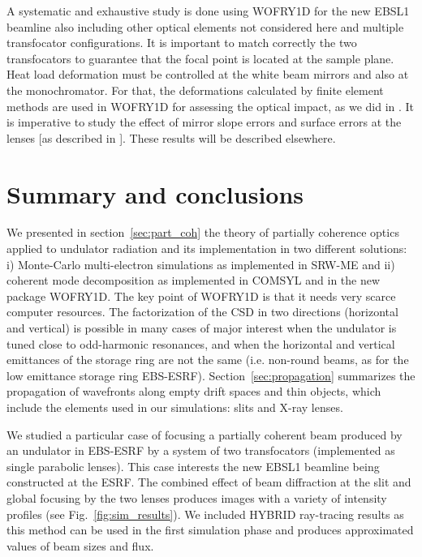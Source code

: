 \documentclass{iucr}
\newcommand{\inblue}[1]{{\color{blue}#1}}
\begin{document}
A systematic and exhaustive study is done using WOFRY1D for the new EBSL1 beamline also including other optical elements not considered here and multiple transfocator configurations. It is important to match correctly the two transfocators to guarantee that the focal point is located at the sample plane. Heat load deformation must be controlled at the white beam mirrors and also at the monochromator. For that, the deformations calculated by finite element methods are used in WOFRY1D for assessing the optical impact, as we did in \cite{srioLBL}. It is imperative to study the effect of mirror slope errors and surface errors at the lenses [as described in \cite{Celestre:mo5214}]. These results will be described elsewhere.


\section{Summary and conclusions}
\label{sec:summary}

We presented in section~\ref{sec:part_coh} the theory of partially coherence optics applied to undulator radiation and its implementation in two different solutions: i) Monte-Carlo multi-electron simulations as implemented in SRW-ME and ii) coherent mode decomposition as implemented in COMSYL and in the new package WOFRY1D.
The key point of WOFRY1D is that it needs very scarce computer resources.
The factorization of the CSD in two directions (horizontal and vertical) is possible in many cases of major interest when the undulator is tuned close to odd-harmonic resonances, and when the horizontal and vertical emittances of the storage ring are not the same (i.e. non-round beams, as for the low emittance storage ring  EBS-ESRF). 
Section~\ref{sec:propagation} summarizes the propagation of wavefronts along empty drift spaces and thin objects, which include the elements used in our simulations: slits and X-ray lenses. 

We studied a particular case of focusing a partially coherent beam produced by an undulator in EBS-ESRF by a system of two transfocators (implemented as single parabolic lenses). This case interests the new EBSL1 beamline being constructed at the ESRF. The combined effect of beam diffraction at the slit and global focusing by the two lenses produces images with a variety of intensity profiles (see \inblue{Fig.~\ref{fig:sim_results}}). 
We included HYBRID ray-tracing results as this method can be used in the first simulation phase and produces approximated values of beam sizes and flux.
\end{document}
